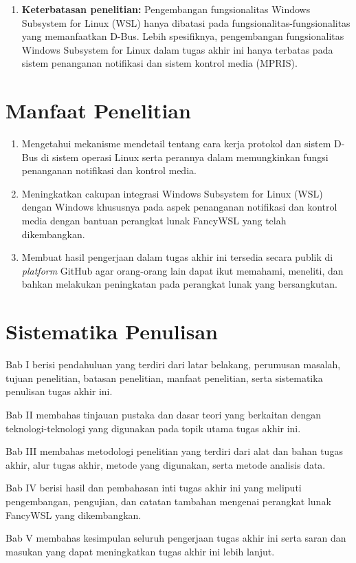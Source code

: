 \begin{enumerate}
    \item \textbf{Keterbatasan penelitian:} Pengembangan fungsionalitas Windows Subsystem for Linux (WSL) hanya dibatasi pada fungsionalitas-fungsionalitas yang memanfaatkan D-Bus. Lebih spesifiknya, pengembangan fungsionalitas Windows Subsystem for Linux dalam tugas akhir ini hanya terbatas pada sistem penanganan notifikasi dan sistem kontrol media (MPRIS).
\end{enumerate}

\section{Manfaat Penelitian}

\begin{enumerate}
    \item Mengetahui mekanisme mendetail tentang cara kerja protokol dan sistem D-Bus di sistem operasi Linux serta perannya dalam memungkinkan fungsi penanganan notifikasi dan kontrol media.

    \item Meningkatkan cakupan integrasi Windows Subsystem for Linux (WSL) dengan Windows khususnya pada aspek penanganan notifikasi dan kontrol media dengan bantuan perangkat lunak FancyWSL yang telah dikembangkan.

    \item Membuat hasil pengerjaan dalam tugas akhir ini tersedia secara publik di \textit{platform} GitHub agar orang-orang lain dapat ikut memahami, meneliti, dan bahkan melakukan peningkatan pada perangkat lunak yang bersangkutan.
\end{enumerate}


\section{Sistematika Penulisan}

\noindent Bab I berisi pendahuluan yang terdiri dari latar belakang, perumusan masalah, tujuan penelitian, batasan penelitian, manfaat penelitian, serta sistematika penulisan tugas akhir ini.

\noindent Bab II membahas tinjauan pustaka dan dasar teori yang berkaitan dengan teknologi-teknologi yang digunakan pada topik utama tugas akhir ini.

\noindent Bab III membahas metodologi penelitian yang terdiri dari alat dan bahan tugas akhir, alur tugas akhir, metode yang digunakan, serta metode analisis data.

\noindent Bab IV berisi hasil dan pembahasan inti tugas akhir ini yang meliputi pengembangan, pengujian, dan catatan tambahan mengenai perangkat lunak FancyWSL yang dikembangkan.

\noindent Bab V membahas kesimpulan seluruh pengerjaan tugas akhir ini serta saran dan masukan yang dapat meningkatkan tugas akhir ini lebih lanjut.
